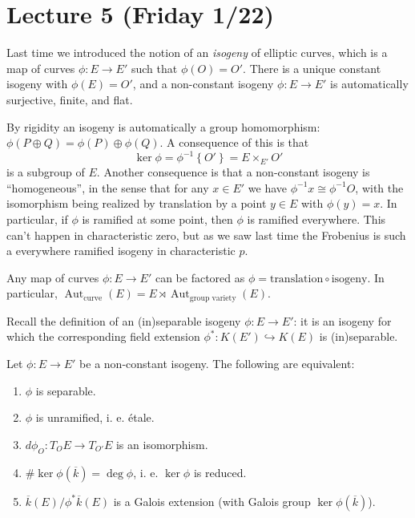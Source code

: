 \section{Lecture 5 (Friday 1/22)}
Last time we introduced the notion of an \textit{isogeny} of elliptic curves, which is a map of curves \( \phi \colon E \to E' \) such that \( \phi(O)=O' \). There is a unique constant isogeny with \( \phi(E) = O' \), and a non-constant isogeny \( \phi \colon E \to E' \) is automatically surjective, finite, and flat.

By rigidity an isogeny is automatically a group homomorphism: \( \phi( P \oplus Q) = \phi(P) \oplus \phi(Q) \).
A consequence of this is that  \[ \ker \phi = \phi^{-1} \left\lbrace O' \right\rbrace = E \times_{E'} O' \]
is a subgroup of \( E \).
Another consequence is that a non-constant isogeny is ``homogeneous'', in the sense that for any \( x \in E' \) we have \( \phi^{-1}  x \cong \phi^{-1} O \), with the isomorphism being realized by translation by a point \( y \in E \) with \( \phi(y) = x \).
In particular, if \( \phi \) is ramified at some point, then \( \phi \) is ramified everywhere.
This can't happen in characteristic zero, but as we saw last time the Frobenius is such a everywhere ramified isogeny in characteristic \( p \).
\begin{remark}
  Any map of curves \( \phi \colon E \to E' \) can be factored as \( \phi = \text{translation} \circ \text{isogeny} \).
  In particular, \( \operatorname{Aut}_{\text{curve}}(E) = E \rtimes \operatorname{Aut}_{\text{group variety}} (E) \).
\end{remark}
Recall the definition of an (in)separable isogeny \( \phi \colon E \to E' \): it is an isogeny for which the corresponding field extension \( \phi^* \colon K(E') \hookrightarrow K(E) \) is (in)separable.
\begin{proposition}
  Let \( \phi \colon E \to E' \) be a non-constant isogeny. The following are equivalent:
  \begin{enumerate}
  \item \( \phi \) is separable.
  \item \( \phi \) is unramified, i. e. \'etale.
  \item \( d \phi _O \colon T_O E \to T_{O'} E \) is an isomorphism.
  \item \( \# \ker \phi ( \overline{k} ) = \operatorname{deg} \phi \), i. e. \( \ker \phi \) is reduced.
  \item \( \overline{k}(E) / \phi^* \overline{k}(E) \) is a Galois extension (with Galois group \( \ker \phi( \overline{k} ) \)).
  \end{enumerate}
\end{proposition}
